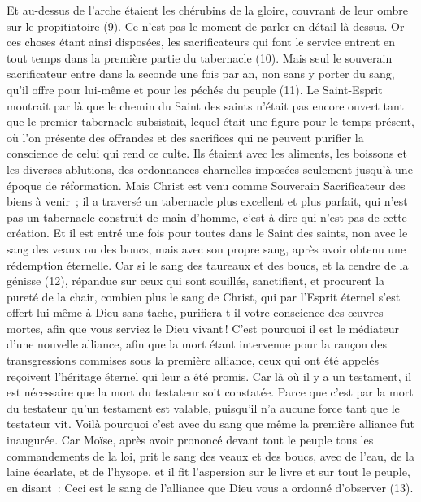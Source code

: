\begin{multicols}{2}
Et au-dessus de l'arche étaient les chérubins de la gloire, couvrant de leur ombre sur le propitiatoire (9). Ce n’est pas le moment de parler en détail là-dessus.
Or ces choses étant ainsi disposées, les sacrificateurs qui font le service entrent en tout temps dans la première partie du tabernacle (10).
Mais seul le souverain sacrificateur entre dans la seconde une fois par an, non sans y porter du sang, qu’il offre pour lui-même et pour les péchés du peuple (11).
Le Saint-Esprit montrait par là que le chemin du Saint des saints n'était pas encore ouvert tant que le premier tabernacle subsistait,
lequel était une figure pour le temps présent, où l’on présente des offrandes et des sacrifices qui ne peuvent purifier la conscience de celui qui rend ce culte.
Ils étaient avec les aliments, les boissons et les diverses ablutions, des ordonnances charnelles imposées seulement jusqu’à une époque de réformation.
Mais Christ est venu comme Souverain Sacrificateur des biens à venir ; il a traversé un tabernacle plus excellent et plus parfait, qui n'est pas un tabernacle construit de main d’homme, c'est-à-dire qui n’est pas de cette création.
Et il est entré une fois pour toutes dans le Saint des saints, non avec le sang des veaux ou des boucs, mais avec son propre sang, après avoir obtenu une rédemption éternelle.
Car si le sang des taureaux et des boucs, et la cendre de la génisse (12), répandue sur ceux qui sont souillés, sanctifient, et procurent la pureté de la chair,
combien plus le sang de Christ, qui par l'Esprit éternel s'est offert lui-même à Dieu sans tache, purifiera-t-il votre conscience des œuvres mortes, afin que vous serviez le Dieu vivant !
C'est pourquoi il est le médiateur d’une nouvelle alliance, afin que la mort étant intervenue pour la rançon des transgressions commises sous la première alliance, ceux qui ont été appelés reçoivent l’héritage éternel qui leur a été promis.
Car là où il y a un testament, il est nécessaire que la mort du testateur soit constatée.
Parce que c'est par la mort du testateur qu'un testament est valable, puisqu’il n'a aucune force tant que le testateur vit.
Voilà pourquoi c’est avec du sang que même la première alliance fut inaugurée.
Car Moïse, après avoir prononcé devant tout le peuple tous les commandements de la loi, prit le sang des veaux et des boucs, avec de l'eau, de la laine écarlate, et de l'hysope, et il fit l’aspersion sur le livre et sur tout le peuple, en disant :
Ceci est le sang de l’alliance que Dieu vous a ordonné d'observer (13).

\end{multicols}
